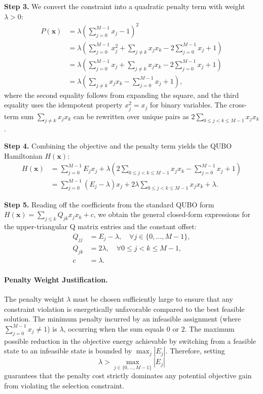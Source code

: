 \documentclass[12pt]{article}
\begin{document}
\textbf{Step 3.} We convert the constraint into a quadratic penalty term with weight $\lambda > 0$:
\begin{align}
P(\mathbf{x}) &= \lambda \left( \sum_{j=0}^{M-1} x_j - 1 \right)^2 \\
&= \lambda \left( \sum_{j=0}^{M-1} x_j^2 + \sum_{j \neq k} x_j x_k - 2 \sum_{j=0}^{M-1} x_j + 1 \right) \\
&= \lambda \left( \sum_{j=0}^{M-1} x_j + \sum_{j \neq k} x_j x_k - 2 \sum_{j=0}^{M-1} x_j + 1 \right) \\
&= \lambda \left( \sum_{j \neq k} x_j x_k - \sum_{j=0}^{M-1} x_j + 1 \right),
\end{align}
where the second equality follows from expanding the square, and the third equality uses the idempotent property $x_j^2 = x_j$ for binary variables. The cross-term sum $\sum_{j \neq k} x_j x_k$ can be rewritten over unique pairs as $2 \sum_{0 \leq j < k \leq M-1} x_j x_k$.

\textbf{Step 4.} Combining the objective and the penalty term yields the QUBO Hamiltonian $H(\mathbf{x})$:
\begin{align}
H(\mathbf{x}) &= \sum_{j=0}^{M-1} E_j x_j + \lambda \left( 2 \sum_{0 \leq j < k \leq M-1} x_j x_k - \sum_{j=0}^{M-1} x_j + 1 \right) \\
&= \sum_{j=0}^{M-1} (E_j - \lambda) x_j + 2\lambda \sum_{0 \leq j < k \leq M-1} x_j x_k + \lambda.
\end{align}

\textbf{Step 5.} Reading off the coefficients from the standard QUBO form $H(\mathbf{x}) = \sum_{j \leq k} Q_{jk} x_j x_k + c$, we obtain the general closed-form expressions for the upper-triangular Q matrix entries and the constant offset:
\begin{align}
Q_{jj} &= E_j - \lambda, \quad \forall j \in \{0, \dots, M-1\}, \\
Q_{jk} &= 2\lambda, \quad \forall 0 \leq j < k \leq M-1, \\
c &= \lambda.
\end{align}

\paragraph{Penalty Weight Justification.}
The penalty weight $\lambda$ must be chosen sufficiently large to ensure that any constraint violation is energetically unfavorable compared to the best feasible solution. The minimum penalty incurred by an infeasible assignment (where $\sum_{j=0}^{M-1} x_j \neq 1$) is $\lambda$, occurring when the sum equals $0$ or $2$. The maximum possible reduction in the objective energy achievable by switching from a feasible state to an infeasible state is bounded by $\max_{j} |E_j|$. Therefore, setting
\begin{equation}
\lambda > \max_{j \in \{0, \dots, M-1\}} |E_j|
\end{equation}
guarantees that the penalty cost strictly dominates any potential objective gain from violating the selection constraint.
\end{document}
